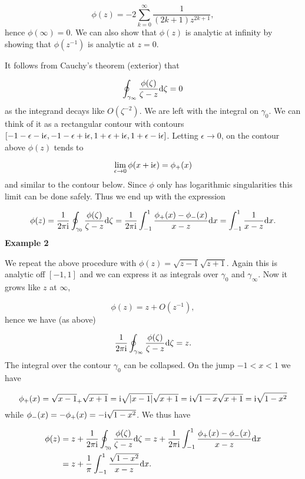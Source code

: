 \documentclass[12pt,landscape]{article}
\def\D{ {\rm d} }
\def\I{ {\rm i} }
\begin{document}
{\[
\phi(z) = -2\sum_{k=0}^{\infty} \frac{1}{(2k+1)z^{2k+1} },
\]
hence $\phi(\infty) = 0$. We can also show that $\phi(z)$ is analytic at infinity by showing that  $\phi(z^{-1})$ is analytic at $z = 0$. 

It follows from Cauchy's theorem (exterior) that

\[
\oint_{\gamma_\infty} {\phi(\zeta) \over \zeta -z} \D \zeta = 0
\]
as the integrand decays like $O(\zeta^{-2})$.
\newpage
We are left with the integral on $\gamma_0$. We can think of it as a rectangular contour with contours $[-1-\epsilon-\I \epsilon, -1 -\epsilon+\I \epsilon,1 +\epsilon+\I\epsilon,1+\epsilon-\I \epsilon]$. Letting $\epsilon \rightarrow 0$, on the contour above $\phi(z)$ tends to

\[
\lim_{\epsilon \rightarrow 0} \phi(x + \I \epsilon) = \phi_+(x)
\]
and similar to the contour below. Since $\phi$ only has logarithmic singularities this limit can be done safely. Thus we end up with the expression

\[
\phi(z) = {1 \over 2 \pi \I} \oint_{\gamma_0} {\phi(\zeta) \over \zeta -z} \D \zeta =
        {1 \over 2 \pi \I} \int_{-1}^1 {\phi_+(x) - \phi_-(x) \over x - z} \D x = \int_{-1}^1 {1 \over x -z} \D x.
\]
\newpage
\textbf{Example 2}

We repeat the above procedure with $\phi(z) = \sqrt{z-1} \sqrt{z+1}$. Again this is analytic off $[-1,1]$ and we can express it as integrals over $\gamma_0$ and $\gamma_\infty$. Now it grows like $z$ at $\infty$,

\[
\phi(z) = z + O(z^{-1}),
\]
hence we have (as above)

\[
{1 \over 2 \pi \I} \oint_{\gamma_\infty} {\phi(\zeta) \over \zeta - z} \D \zeta = z.
\]
The integral over the contour $\gamma_0$ can be collapsed. On the jump $-1 < x < 1$ we have

\[
\phi_+(x) = \sqrt{x-1}_+ \sqrt{x+1} = \I \sqrt{|x-1|} \sqrt{x+1} = \I \sqrt{1-x} \sqrt{x+1} = \I \sqrt{1-x^2}
\]
while $\phi_-(x) = - \phi_+(x) = - \I \sqrt{1-x^2}$. We thus have


\begin{align*}
\phi(z) &= z + {1 \over 2 \pi \I} \oint_{\gamma_0} {\phi(\zeta) \over \zeta -z} \D \zeta =
        z + {1 \over 2 \pi \I} \int_{-1}^1 {\phi_+(x) - \phi_-(x) \over x - z} \D x \\
        &=
        z + {1 \over \pi} \int_{-1}^1 {\sqrt{1-x^2} \over x -z} \D x.
\end{align*}



}
\end{document}
